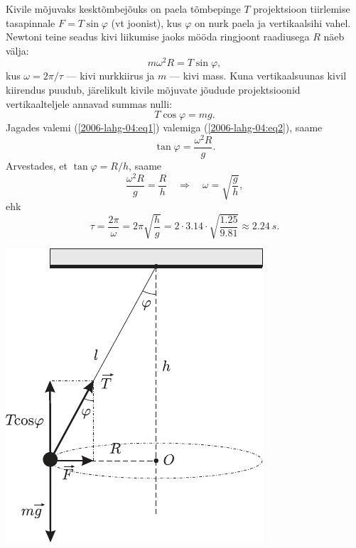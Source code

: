 \documentclass[10pt]{article}
\begin{document}
{
\solu
Kivile mõjuvaks kesktõmbejõuks on paela tõmbepinge $T$ projektsioon tiirlemise
tasapinnale $F = T \sin \varphi$ (vt joonist), kus $\varphi$ on nurk paela ja vertikaalsihi vahel. Newtoni teine seadus kivi liikumise jaoks mööda ringjoont raadiusega $R$ näeb välja:
\begin{equation} \label{2006-lahg-04:eq1}
m\omega^2R = T \sin \varphi,
\end{equation}
kus $\omega = 2\pi /\tau$ --- kivi nurkkiirus ja $m$ --- kivi mass. Kuna vertikaalsuunas kivil kiirendus puudub, järelikult kivile mõjuvate jõudude projektsioonid vertikaalteljele annavad summas nulli:
\begin{equation} \label{2006-lahg-04:eq2}
T \cos\varphi = mg.
\end{equation}
Jagades valemi (\ref{2006-lahg-04:eq1}) valemiga (\ref{2006-lahg-04:eq2}), saame
\[
\tan \varphi = \frac{\omega^2R}{g}.
\]
Arvestades, et $\tan \varphi = R/h$, saame
\[
\frac{\omega^{2} R}{g}=\frac{R}{h} \quad \Rightarrow \quad \omega=\sqrt{\frac{g}{h}},
\]
ehk
\[
\tau=\frac{2 \pi}{\omega}=2 \pi \sqrt{\frac{h}{g}}=2 \cdot \num{3,14} \cdot \sqrt{\frac{\num{1,25}}{\num{9,81}}} \approx \SI{2,24}{s}.
\]

\begin{center}
	\includegraphics[width=0.7\linewidth]{2006-lahg-04-lah}
\end{center}
\probend
\bigskip


}
\end{document}
